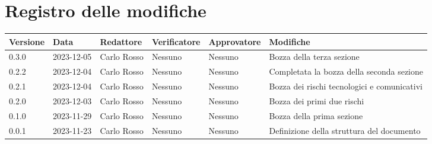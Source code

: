 \section*{Registro delle modifiche}

\begin{table}[H]
	\centering
	\fontsize{10}{12}\selectfont
	\begin{tabularx}{\textwidth}{l|l|l|l|l|X}
		\textbf{Versione}     & \textbf{Data}        & \textbf{Redattore} &
		\textbf{Verificatore} & \textbf{Approvatore} & \textbf{Modifiche}                                                                   \\
		\toprule
		0.3.0                 & 2023-12-05           & Carlo Rosso        & Nessuno & Nessuno & Bozza della terza sezione                   \\
		0.2.2                 & 2023-12-04           & Carlo Rosso        & Nessuno & Nessuno & Completata la bozza della seconda sezione   \\
		0.2.1                 & 2023-12-04           & Carlo Rosso        & Nessuno & Nessuno & Bozza dei rischi tecnologici e comunicativi \\
		0.2.0                 & 2023-12-03           & Carlo Rosso        & Nessuno & Nessuno & Bozza dei primi due rischi                  \\
		0.1.0                 & 2023-11-29           & Carlo Rosso        & Nessuno & Nessuno & Bozza della prima sezione                   \\
		0.0.1                 & 2023-11-23           & Carlo Rosso        & Nessuno & Nessuno & Definizione della struttura del documento   \\
		\bottomrule
	\end{tabularx}
\end{table}
